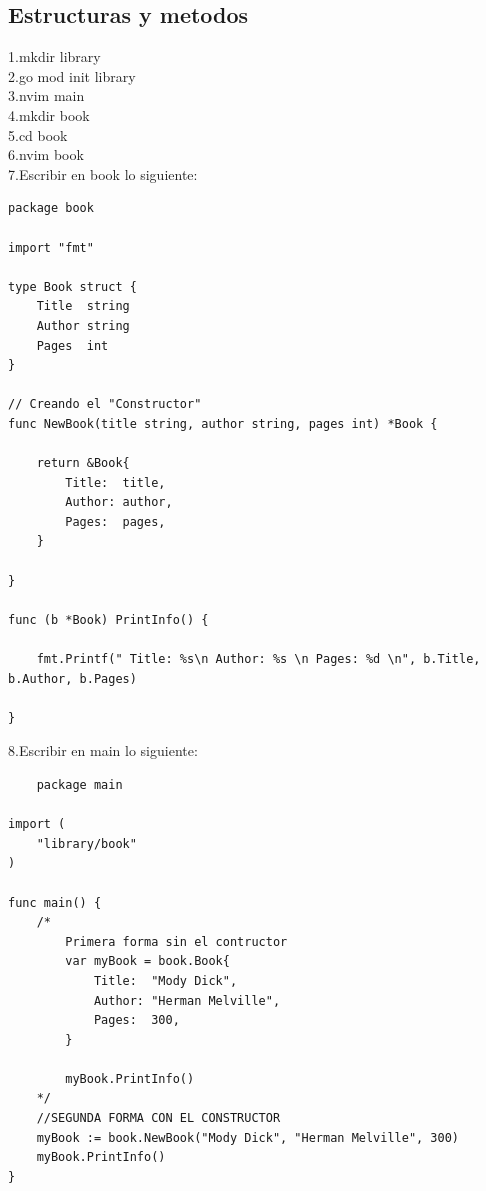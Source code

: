 \documentclass[10pt,a4paper]{article}
\begin{document}
\subsection{Estructuras y metodos}
1.mkdir library \\
2.go mod init library \\
3.nvim main \\
4.mkdir book \\
5.cd book \\
6.nvim book \\
7.Escribir en book lo siguiente: 
\begin{verbatim}
package book

import "fmt"

type Book struct {
	Title  string
	Author string
	Pages  int
}

// Creando el "Constructor"
func NewBook(title string, author string, pages int) *Book {

	return &Book{
		Title:  title,
		Author: author,
		Pages:  pages,
	}

}

func (b *Book) PrintInfo() {

	fmt.Printf(" Title: %s\n Author: %s \n Pages: %d \n", b.Title, b.Author, b.Pages)

}
\end{verbatim}
8.Escribir en main lo siguiente: 
\begin{verbatim}
    package main

import (
	"library/book"
)

func main() {
	/*
		Primera forma sin el contructor
		var myBook = book.Book{
			Title:  "Mody Dick",
			Author: "Herman Melville",
			Pages:  300,
		}

		myBook.PrintInfo()
	*/
	//SEGUNDA FORMA CON EL CONSTRUCTOR
	myBook := book.NewBook("Mody Dick", "Herman Melville", 300)
	myBook.PrintInfo()
}
\end{verbatim}
\end{document}
